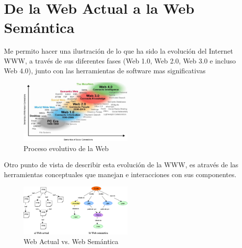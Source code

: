 \documentclass[conference]{IEEEtran}\usepackage[]{graphicx}\usepackage[]{color}
\begin{document}
\section{De la Web Actual a la Web Semántica}
Me permito hacer una ilustración de lo que ha sido la evolución del Internet WWW, a través de sus diferentes fases (Web 1.0, Web 2.0, Web 3.0 e incluso Web 4.0), junto con las herramientas de software mas significativas
\begin{figure}[h]
	\centering
	\includegraphics[width=0.5\textwidth]{ws-evolucion-proy}
	\caption{Proceso evolutivo de la Web}
\end{figure}
Otro punto de vista de describir esta evolución de la WWW, es através de las herramientas conceptuales que manejan e interacciones con sus componentes.
\begin{figure}[h]
	\centering
	\includegraphics[width=0.5\textwidth]{ws-actual-ws2}
	\caption{Web Actual vs. Web Semántica}
\end{figure}


\end{document}
